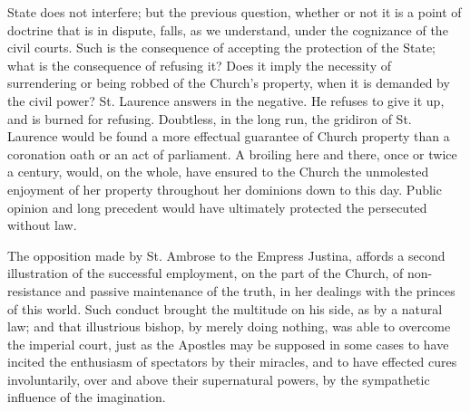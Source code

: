 State does not interfere; but the previous question, whether or not it
is a point of doctrine that is in dispute, falls, as we understand,
under the cognizance of the civil courts. Such is the consequence of
accepting the protection of the State; what is the consequence of
refusing it? Does it imply the necessity of surrendering or being
robbed of the Church's property, when it is demanded by the civil
power? St. Laurence answers in the negative. He refuses to give it up,
and is burned for refusing. Doubtless, in the long run, the gridiron
of St. Laurence would be found a more effectual guarantee of Church
property than a coronation oath or an act of parliament. A broiling
here and there, once or twice a century, would, on the whole, have
ensured to the Church the unmolested enjoyment of her property
throughout her dominions down to this day. Public opinion and long
precedent would have ultimately protected the persecuted without law.

The opposition made by St. Ambrose to the Empress
Justina, affords a second illustration of the successful employment,
on the part of the Church, of non-resistance and passive maintenance
of the truth, in her dealings with the princes of this world. Such
conduct brought the multitude on his side, as by a natural law; and
that illustrious bishop, by merely doing nothing, was able to
overcome the imperial court, just as the Apostles may be supposed in
some cases to have incited the enthusiasm of spectators by their
miracles, and to have effected cures involuntarily, over and above
their supernatural powers, by the sympathetic influence of the
imagination.

